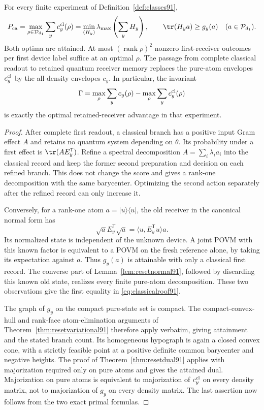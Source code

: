 \begin{theorem}
\label{thm:classicalroof91}
For every finite experiment of Definition~\ref{def:classes91},
\begin{equation}\label{eq:classicalroof91}
 P_{\rm ca}=\max_{\rho\in\mathcal D_{d_1}}\sum_yc_y^{\rm cl}(\rho)
 =\min_{(H_y)}\lambda_{\max}\left(\sum_yH_y\right),
 \qquad \tr(H_ya)\ge g_y(a)\quad(a\in\mathcal P_{d_1}).
\end{equation}
Both optima are attained.  At most
$(\operatorname{rank}\rho)^2$ nonzero first-receiver outcomes per
first device label suffice at an optimal $\rho$.
The passage from complete classical readout to retained quantum
receiver memory replaces the pure-atom envelopes $c_y^{\rm cl}$ by
the all-density envelopes $c_y$.  In particular, the invariant
\begin{equation}\label{eq:receivergap91}
 \Gamma=\max_\rho\sum_yc_y(\rho)
          -\max_\rho\sum_yc_y^{\rm cl}(\rho)
\end{equation}
is exactly the optimal retained-receiver advantage in that experiment.
\end{theorem}
\begin{proof}
After complete first readout, a classical branch has a positive input
Gram effect $A$ and retains no quantum system depending on $\theta$.
Its probability under a first effect is $\tr(AE_y^{\mathsf T})$.
Refine a spectral decomposition $A=\sum_i\lambda_i a_i$ into the
classical record and keep the former second preparation and decision
on each refined branch.  This does not change the score and gives a
rank-one decomposition with the same barycenter.  Optimizing the
second action separately after the refined record can only increase it.

Conversely, for a rank-one atom $a=|u\rangle\langle u|$, the old
receiver in the canonical normal form has
\[
 \sqrt a E_y^{\mathsf T}\sqrt a
 =\langle u,E_y^{\mathsf T}u\rangle a.
\]
Its normalized state is independent of the unknown device.  A joint
POVM with this known factor is equivalent to a POVM on the fresh
reference alone, by taking its expectation against $a$.
Thus $g_y(a)$ is attainable with only a classical first record.
The converse part of Lemma~\ref{lem:resetnormal91}, followed by discarding
this known old state, realizes every finite pure-atom decomposition.
These two observations give the first equality in
\eqref{eq:classicalroof91}.

The graph of $g_y$ on the compact pure-state set is compact.  The
compact-convex-hull and rank-face atom-elimination arguments of
Theorem~\ref{thm:resetvariational91} therefore apply verbatim, giving
attainment and the stated branch count.  Its homogeneous hypograph is
again a closed convex cone, with a strictly feasible point at a
positive definite common barycenter and negative heights.  The proof
of Theorem~\ref{thm:resetdual91} applies with majorization required only
on pure atoms and gives the attained dual.  Majorization on pure atoms
is equivalent to majorization of $c_y^{\rm cl}$ on every density matrix,
not to majorization of $g_y$ on every density matrix.  The last assertion
now follows from the two exact primal formulas.
\end{proof}

